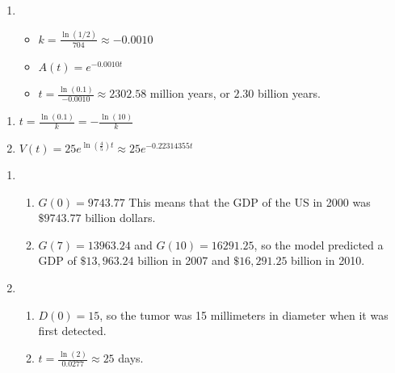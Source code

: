 \begin{enumerate}
\setcounter{enumi}{\value{HW}}

\item  \begin{itemize}  \item $k = \frac{\ln(1/2)}{704} \approx -0.0010$

\item $A(t) = e^{-0.0010t}$

\item $t = \frac{\ln(0.1)}{-0.0010} \approx 2302.58$ million years, or $2.30$ billion years.

\end{itemize}


\setcounter{HW}{\value{enumi}}
\end{enumerate}

\begin{multicols}{2}
\begin{enumerate}
\setcounter{enumi}{\value{HW}}


\item  $t = \frac{\ln(0.1)}{k} = -\frac{\ln(10)}{k}$

\item $V(t) = 25e^{\ln\left(\frac{4}{5}\right)t} \approx 25e^{-0.22314355t}$

\setcounter{HW}{\value{enumi}}
\end{enumerate}
\end{multicols}


\begin{enumerate}
\setcounter{enumi}{\value{HW}}


\item \begin{enumerate}  \item  $G(0) = 9743.77$  This means that the GDP of the US in 2000 was $\$9743.77$ billion dollars.

\item  $G(7) = 13963.24$ and $G(10) = 16291.25$, so the model predicted a GDP of $\$ 13,963.24$ billion in 2007 and $\$ 16,291.25$ billion in 2010. 

\end{enumerate}

\item \begin{enumerate} \item $D(0) = 15$, so the tumor was 15 millimeters in diameter when it was first detected.

\item  $t = \frac{\ln(2)}{0.0277} \approx 25$ days.

\end{enumerate}

\setcounter{HW}{\value{enumi}}
\end{enumerate}

